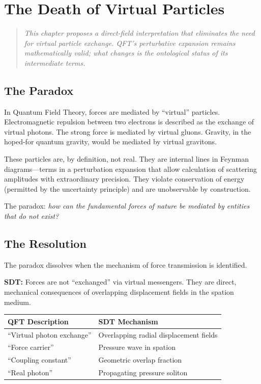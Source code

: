 \chapter{The Death of Virtual Particles}
\label{ch:virtual-particles}

\begin{quote}
\emph{This chapter proposes a direct-field interpretation that eliminates the need for virtual particle exchange. QFT's perturbative expansion remains mathematically valid; what changes is the ontological status of its intermediate terms.}
\end{quote}

\section{The Paradox}

In Quantum Field Theory, forces are mediated by ``virtual'' particles. Electromagnetic repulsion between two electrons is described as the exchange of virtual photons. The strong force is mediated by virtual gluons. Gravity, in the hoped-for quantum gravity, would be mediated by virtual gravitons.

These particles are, by definition, not real. They are internal lines in Feynman diagrams---terms in a perturbation expansion that allow calculation of scattering amplitudes with extraordinary precision. They violate conservation of energy (permitted by the uncertainty principle) and are unobservable by construction.

The paradox: \emph{how can the fundamental forces of nature be mediated by entities that do not exist?}


\section{The Resolution}

The paradox dissolves when the mechanism of force transmission is identified.

\textbf{SDT:} Forces are not ``exchanged'' via virtual messengers. They are direct, mechanical consequences of overlapping displacement fields in the spation medium.

\begin{center}
\begin{tabular}{ll}
\toprule
\textbf{QFT Description} & \textbf{SDT Mechanism} \\
\midrule
``Virtual photon exchange'' & Overlapping radial displacement fields \\
``Force carrier'' & Pressure wave in spation \\
``Coupling constant'' & Geometric overlap fraction \\
``Real photon'' & Propagating pressure soliton \\
\bottomrule
\end{tabular}
\end{center}

